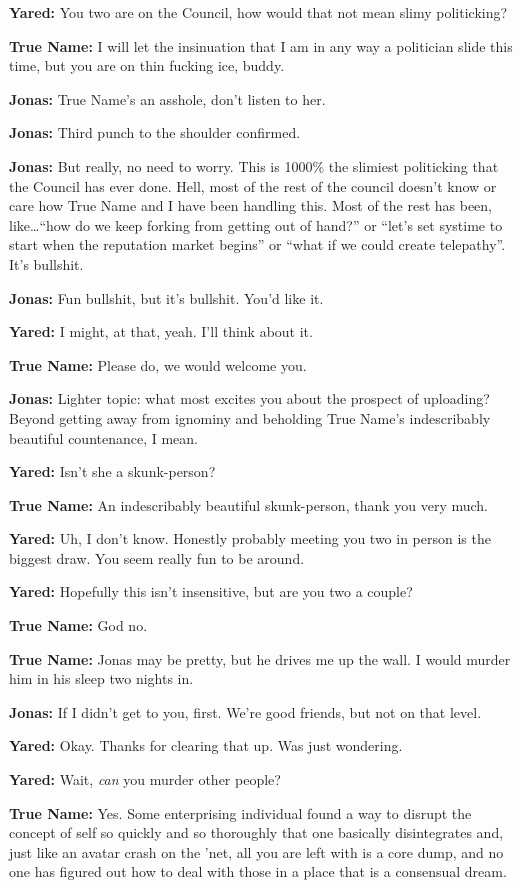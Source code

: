 \textbf{Yared:} You two are on the Council, how would that not mean slimy politicking?

\textbf{True Name:} I will let the insinuation that I am in any way a politician slide this time, but you are on thin fucking ice, buddy.

\textbf{Jonas:} True Name's an asshole, don't listen to her.

\textbf{Jonas:} Third punch to the shoulder confirmed.

\textbf{Jonas:} But really, no need to worry. This is 1000\% the slimiest politicking that the Council has ever done. Hell, most of the rest of the council doesn't know or care how True Name and I have been handling this. Most of the rest has been, like\ldots{}``how do we keep forking from getting out of hand?'' or ``let's set systime to start when the reputation market begins'' or ``what if we could create telepathy''. It's bullshit.

\textbf{Jonas:} Fun bullshit, but it's bullshit. You'd like it.

\textbf{Yared:} I might, at that, yeah. I'll think about it.

\textbf{True Name:} Please do, we would welcome you.

\textbf{Jonas:} Lighter topic: what most excites you about the prospect of uploading? Beyond getting away from ignominy and beholding True Name's indescribably beautiful countenance, I mean.

\textbf{Yared:} Isn't she a skunk-person?

\textbf{True Name:} An indescribably beautiful skunk-person, thank you very much.

\textbf{Yared:} Uh, I don't know. Honestly probably meeting you two in person is the biggest draw. You seem really fun to be around.

\textbf{Yared:} Hopefully this isn't insensitive, but are you two a couple?

\textbf{True Name:} God no.

\textbf{True Name:} Jonas may be pretty, but he drives me up the wall. I would murder him in his sleep two nights in.

\textbf{Jonas:} If I didn't get to you, first. We're good friends, but not on that level.

\textbf{Yared:} Okay. Thanks for clearing that up. Was just wondering.

\textbf{Yared:} Wait, \emph{can} you murder other people?

\textbf{True Name:} Yes. Some enterprising individual found a way to disrupt the concept of self so quickly and so thoroughly that one basically disintegrates and, just like an avatar crash on the 'net, all you are left with is a core dump, and no one has figured out how to deal with those in a place that is a consensual dream.

